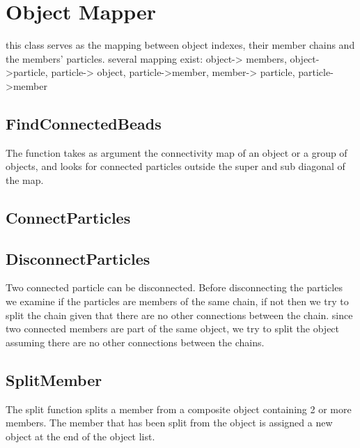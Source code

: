 \documentclass[12pt]{report}
\begin{document}
\section{Object Mapper}
this class serves as the mapping between object indexes, their member chains and the members' particles. 
several mapping exist: object-> members, object->particle, particle-> object,  particle->member, member-> particle, particle->member

\subsection{FindConnectedBeads}
The function takes as argument the connectivity map of an object or a group of objects, and looks for connected particles outside the super and sub diagonal of the map. 

\subsection{ConnectParticles}


\subsection{DisconnectParticles}
Two connected particle can be disconnected. Before disconnecting the particles we examine if the particles are members of the same chain, if not then we try to split the chain given that there are no other connections between the chain.
since two connected members are part of the same object, we try to split the object assuming there are no other connections between the chains.

\subsection{SplitMember}
The split function splits a member from a composite object containing 2 or more members. The member that has been split from the object is assigned a new object at the end of the object list.  
\end{document}
